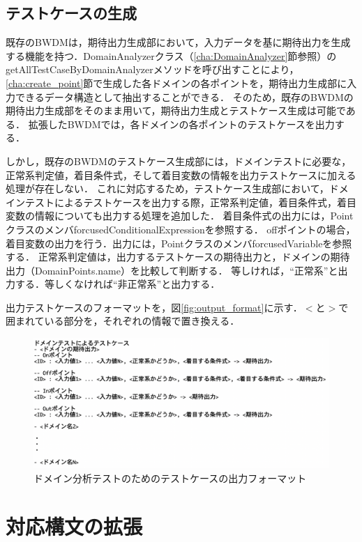 \documentclass[uplatex, report, a4j, 10pt]{jsbook}
\begin{document}
\subsection{テストケースの生成}
既存のBWDMは，期待出力生成部において，入力データを基に期待出力を生成する機能を持つ．DomainAnalyzerクラス（\ref{cha:DomainAnalyzer}節参照）のgetAllTestCaseByDomainAnalyzerメソッドを呼び出すことにより，\ref{cha:create_point}節で生成した各ドメインの各ポイントを，期待出力生成部に入力できるデータ構造として抽出することができる．
そのため，既存のBWDMの期待出力生成部をそのまま用いて，期待出力生成とテストケース生成は可能である．
拡張したBWDMでは，各ドメインの各ポイントのテストケースを出力する．

しかし，既存のBWDMのテストケース生成部には，ドメインテストに必要な，正常系判定値，着目条件式，そして着目変数の情報を出力テストケースに加える処理が存在しない．
これに対応するため，テストケース生成部において，ドメインテストによるテストケースを出力する際，正常系判定値，着目条件式，着目変数の情報についても出力する処理を追加した．
着目条件式の出力には，PointクラスのメンバforcusedConditionalExpressionを参照する．
offポイントの場合，着目変数の出力を行う．出力には，PointクラスのメンバforcusedVariableを参照する．
正常系判定値は，出力するテストケースの期待出力と，ドメインの期待出力（DomainPoints.name）を比較して判断する．
等しければ，“正常系”と出力する．等しくなければ“非正常系”と出力する．

出力テストケースのフォーマットを，図\ref{fig:output_format}に示す．$<$と$>$で囲まれている部分を，それぞれの情報で置き換える．

\begin{figure}[tp]
  \centering
  \includegraphics[keepaspectratio, width=160mm]{figs/dmin_output_format}
  \caption{ドメイン分析テストのためのテストケースの出力フォーマット}
  \label{fig:dmin_output_format}
\end{figure}

\section{対応構文の拡張}
\end{document}
